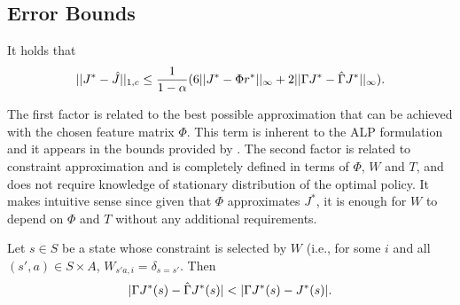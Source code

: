 \subsection{Error Bounds}
\begin{theorem}
\label{cmt2mn}
It holds that
\begin{align*}%
\begin{split}
||J^*-\hj||_{1,c}
\leq\frac{1}{1-\alpha}(6 ||J^*-\Phi r^*||_{\infty}
+2||\Gamma J^*-\hg J^*||_{\infty}).
\end{split}
\end{align*}
\end{theorem}
The first factor is related to the best possible approximation that can be achieved with the chosen feature matrix $\Phi$. This term is inherent to the ALP formulation and it appears in the bounds provided by \cite{ALP}.
The second factor is related to constraint approximation and is completely defined in terms of $\Phi$, $W$ and $T$, and does not require knowledge of stationary distribution of the optimal policy. It makes intuitive sense since given that $\Phi$ approximates $J^*$, it is enough for $W$ to depend on $\Phi$ and $T$ without any additional requirements.\par
\begin{comment}
\begin{theorem}[Control Error Bound in $\norm{\cdot}_{\infty}$]
\label{polthe}
Let $\hu$ be the greedy policy with respect to the solution $\hj$ of the GRLP and $J_{\hu}$ be its value function.
Then,
\begin{align}\label{polthebnd}
\norm{J^* - J_{\hu}}_{1,c}
&\leq 2\left(\frac{c^\top \psi}{(1-\beta_{\psi})^2}\right)\, \big( 2||J^*-\Phi r^*||_{\infty}
\nn\\&
+||\Gamma J^*-\hg J^*||_{\infty}+||\hj-\hg\hj||_{\infty}\big).
\end{align}
\end{theorem}
\end{comment}
\begin{theorem}\label{st}
Let $s\in S$ be a state whose constraint is selected by $W$ (i.e., for some $i$ and all $(s',a)\in S\times A$,
$W_{s'a,i}=\delta_{s=s'}$.
Then
\begin{align*}%
|\Gamma J^*(s)-\hg J^*(s)|<|\Gamma J^*(s)-J^*(s)|.
\end{align*}
\end{theorem}
